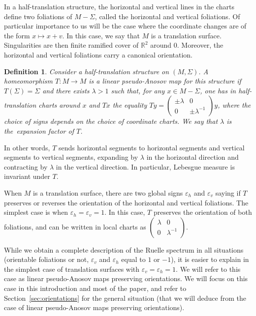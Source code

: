 \documentclass[11pt, a4paper, oneside, final, pagebackref]{amsart}
\newcommand{\R}{\mathbb{R}}
\renewcommand{\epsilon}{\varepsilon}
\newtheorem{definition}[thm]{Definition}
\theoremstyle{definition}
\numberwithin{equation}{section}
\begin{document}
In a half-translation structure, the horizontal and vertical lines in the
charts define two foliations of $M-\Sigma$, called the horizontal and
vertical foliations. Of particular importance to us will be the case where
the coordinate changes are of the form $x \mapsto x + v$. In this case, we
say that $M$ is a translation surface. Singularities are then finite ramified
cover of $\R^2$ around $0$. Moreover, the horizontal and vertical foliations
carry a canonical orientation.

\begin{definition}
Consider a half-translation structure on $(M,\Sigma)$. A homeomorphism
$T:M\to M$ is a linear pseudo-Anosov map for this structure if
$T(\Sigma)=\Sigma$ and there exists $\lambda>1$ such that, for any $x \in
M-\Sigma$, one has in half-translation charts around $x$ and $Tx$ the
equality $T y = \left(\begin{smallmatrix} \pm \lambda & 0 \\ 0 & \pm
\lambda^{-1}
\end{smallmatrix}\right)y$, where the choice of signs depends on the
choice of coordinate charts. We say that $\lambda$ is the~\emph{expansion
factor} of $T$.
\end{definition}
In other words, $T$ sends horizontal segments to horizontal segments and
vertical segments to vertical segments, expanding by $\lambda$ in the
horizontal direction and contracting by $\lambda$ in the vertical direction.
In particular, Lebesgue measure is invariant under $T$.

When $M$ is a translation surface, there are two global signs $\epsilon_h$
and $\epsilon_v$ saying if $T$ preserves or reverses the orientation of the
horizontal and vertical foliations. The simplest case is when $\epsilon_h =
\epsilon_v = 1$. In this case, $T$ preserves the orientation of both
foliations, and can be written in local charts as $\left(\begin{smallmatrix}
\lambda & 0 \\ 0 & \lambda^{-1}
\end{smallmatrix}\right)$.

While we obtain a complete description of the Ruelle spectrum in all
situations (orientable foliations or not, $\epsilon_v$ and $\epsilon_h$ equal
to $1$ or $-1$), it is easier to explain in the simplest case of translation
surfaces with $\epsilon_v = \epsilon_h = 1$. We will refer to this case as
linear pseudo-Anosov maps preserving orientations. We will focus on this case
in this introduction and most of the paper, and refer to
Section~\ref{sec:orientations} for the general situation (that we will deduce from the
case of linear pseudo-Anosov maps preserving orientations).
\end{document}

